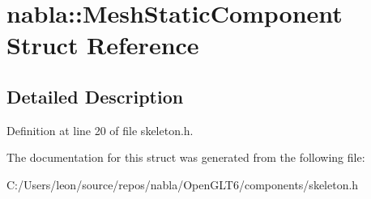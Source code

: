 \hypertarget{structnabla_1_1_mesh_static_component}{}\section{nabla\+::Mesh\+Static\+Component Struct Reference}
\label{structnabla_1_1_mesh_static_component}


\subsection{Detailed Description}


Definition at line 20 of file skeleton.\+h.



The documentation for this struct was generated from the following file\+:\begin{DoxyCompactItemize}
\item 
C\+:/\+Users/leon/source/repos/nabla/\+Open\+G\+L\+T6/components/skeleton.\+h\end{DoxyCompactItemize}
